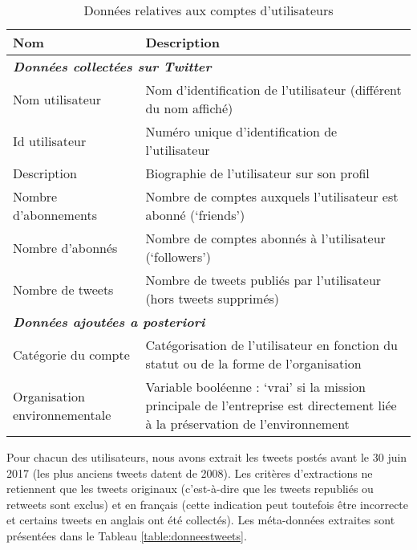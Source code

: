     \begin{table}[h]
        \caption{Données relatives aux comptes d'utilisateurs}
        \label{table:donneesutilisateurs}
        \begin{tabularx}{\linewidth}{|l|X|}
            \hline
            \textbf{Nom} & \textbf{Description} \\ \hline
        \multicolumn{2}{|l|}{\textbf{\textit{Données collectées sur Twitter}}} \\ \hline
            Nom utilisateur &	Nom d’identification de l’utilisateur (différent du nom affiché) \\ \hline
            Id utilisateur &	Numéro unique d’identification de l’utilisateur  \\ \hline
            Description	 & Biographie de l’utilisateur sur son profil \\ \hline
            Nombre d’abonnements &	Nombre de comptes auxquels l’utilisateur est abonné (‘friends’) \\ \hline
            Nombre d’abonnés &	Nombre de comptes abonnés à l’utilisateur (‘followers’) \\ \hline
            Nombre de tweets &	Nombre de tweets publiés par l’utilisateur (hors tweets supprimés) \\ \hline
        \multicolumn{2}{|l|}{\textbf{\textit{Données ajoutées a posteriori}}} \\ \hline
            Catégorie du compte	& Catégorisation de l’utilisateur en fonction du statut ou de la forme de l’organisation  \\ \hline
            Organisation environnementale	& Variable booléenne : ‘vrai’ si la mission principale de l’entreprise est directement liée à la préservation de l’environnement  \\ \hline
        \end{tabularx}
    \end{table}

    Pour chacun des utilisateurs, nous avons extrait les tweets postés avant le 30 juin 2017 (les plus anciens tweets datent de 2008). Les critères d’extractions ne retiennent que les tweets originaux (c'est-à-dire que les tweets republiés ou retweets sont exclus) et en français (cette indication peut toutefois être incorrecte et certains tweets en anglais ont été collectés). Les méta-données extraites sont présentées dans le Tableau \ref{table:donneestweets}.


